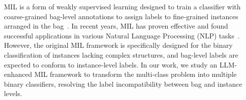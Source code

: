 MIL is a form of weakly supervised learning designed to train a classifier with coarse-grained bag-level annotations to assign labels to fine-grained instances arranged in the bag~\cite{dietterich1997solving}. 
In recent years, MIL has proven effective and found successful applications in various Natural Language Processing (NLP) tasks~\cite{yang-etal-2023-wsdms}.
However, the original MIL framework is specifically designed for the binary classification of instances lacking complex structures, and bag-level labels are expected to conform to instance-level labels. 
In our work, we study an LLM-enhanced MIL framework to transform the multi-class problem into multiple binary classifiers, resolving the label incompatibility between bag and instance levels.

